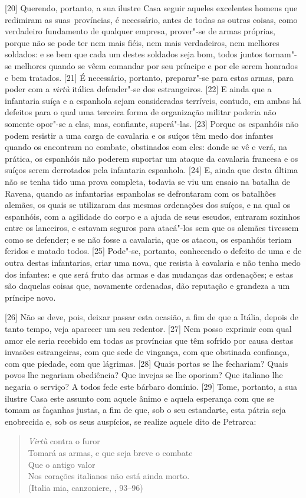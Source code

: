 {[}20{]} Querendo, portanto, a sua ilustre Casa seguir aqueles
excelentes homens que redimiram as suas\est\ províncias, é necessário, antes
de todas as outras coisas, como verdadeiro fundamento de qualquer
empresa, prover"-se de armas próprias, porque não se pode ter nem mais
fiéis, nem mais verdadeiros, nem melhores soldados: e se bem que cada um
destes soldados seja bom, todos juntos tornam"-se melhores quando se vêem
comandar por seu príncipe e por ele serem honrados e bem tratados.
{[}21{]} É necessário, portanto, preparar"-se para estas armas, para
poder com a \emph{virtù} itálica defender"-se dos estrangeiros. {[}22{]}
E ainda que a infantaria suíça e a espanhola sejam consideradas
terríveis, contudo, em ambas há defeitos para o qual uma terceira forma
de organização militar poderia não somente opor"-se a elas, mas,
confiante, superá"-las. {[}23{]} Porque os espanhóis não podem resistir a
uma carga de cavalaria e os suíços têm medo dos infantes quando os
encontram no combate, obstinados com eles: donde se vê e verá, na
prática, os espanhóis não poderem suportar um ataque da cavalaria
francesa e os suíços serem derrotados pela infantaria espanhola.
{[}24{]} E, ainda que desta última não se tenha tido uma prova completa,
todavia se viu um ensaio na batalha de Ravena, quando as infantarias espanholas se defrontaram com os batalhões
alemães, os quais se utilizaram das mesmas ordenações dos suíços, e na
qual os espanhóis, com a agilidade do corpo e a ajuda de seus
escudos, entraram sozinhos entre os lanceiros, e estavam
seguros para atacá"-los sem que os alemães tivessem como se defender; e
se não fosse a cavalaria, que os atacou, os espanhóis teriam feridos e
matado todos. {[}25{]} Pode"-se, portanto, conhecendo o defeito de uma e
de outra destas infantarias, criar uma nova, que resista à cavalaria e
não tenha medo dos infantes: e que será fruto das armas e das mudanças
das ordenações; e estas são daquelas coisas que, novamente ordenadas,
dão reputação e grandeza a um príncipe novo.

{[}26{]} Não se deve, pois, deixar passar esta ocasião, a fim de que a
Itália, depois de tanto tempo, veja aparecer um seu redentor. {[}27{]}
Nem posso exprimir com qual amor ele seria recebido em todas as
províncias que têm sofrido por causa destas invasões estrangeiras, com
que sede de vingança, com que obstinada confiança, com que piedade, com
que lágrimas. {[}28{]} Quais portas se lhe fechariam? Quais povos lhe
negariam obediência? Que invejas se lhe oporiam? Que italiano lhe
negaria o serviço? A todos fede este bárbaro domínio. {[}29{]} Tome,
portanto, a sua ilustre Casa este assunto com aquele ânimo e aquela
esperança com que se tomam as façanhas justas, a fim de que, sob o seu
estandarte, esta pátria seja enobrecida e, sob os seus auspícios, se
realize aquele dito de Petrarca:

\begin{verse}
\emph{Virtù} contra o furor\\
Tomará as armas, e que seja breve o combate\\
Que o antigo valor\\
Nos corações italianos não está ainda morto.\\
(Italia mia, canzoniere, , 93--96)
\end{verse}


